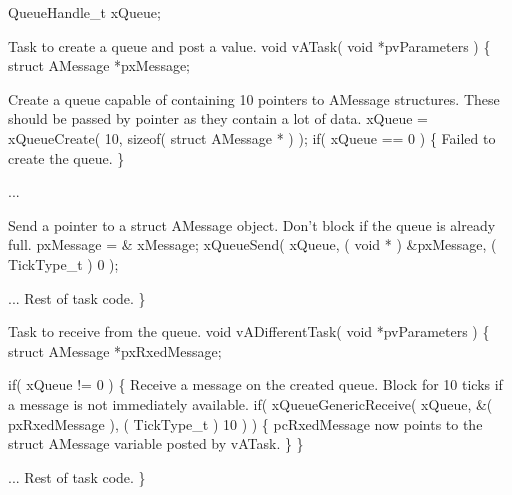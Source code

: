 \begin{DoxyPre} QueueHandle\_t xQueue;\end{DoxyPre}



\begin{DoxyPre}Task to create a queue and post a value.
 void vATask( void *pvParameters )
 \{
 struct AMessage *pxMessage;\end{DoxyPre}



\begin{DoxyPre}Create a queue capable of containing 10 pointers to AMessage structures.
These should be passed by pointer as they contain a lot of data.
    xQueue = xQueueCreate( 10, sizeof( struct AMessage * ) );
    if( xQueue == 0 )
    \{
Failed to create the queue.
    \}\end{DoxyPre}



\begin{DoxyPre}...\end{DoxyPre}



\begin{DoxyPre}Send a pointer to a struct AMessage object.  Don't block if the
queue is already full.
    pxMessage = \& xMessage;
    xQueueSend( xQueue, ( void * ) \&pxMessage, ( TickType\_t ) 0 );\end{DoxyPre}



\begin{DoxyPre}... Rest of task code.
 \}\end{DoxyPre}



\begin{DoxyPre}Task to receive from the queue.
 void vADifferentTask( void *pvParameters )
 \{
 struct AMessage *pxRxedMessage;\end{DoxyPre}



\begin{DoxyPre}    if( xQueue != 0 )
    \{
Receive a message on the created queue.  Block for 10 ticks if a
message is not immediately available.
        if( xQueueGenericReceive( xQueue, \&( pxRxedMessage ), ( TickType\_t ) 10 ) )
        \{
pcRxedMessage now points to the struct AMessage variable posted
by vATask.
        \}
    \}\end{DoxyPre}



\begin{DoxyPre}... Rest of task code.
 \}
 \end{DoxyPre}
 